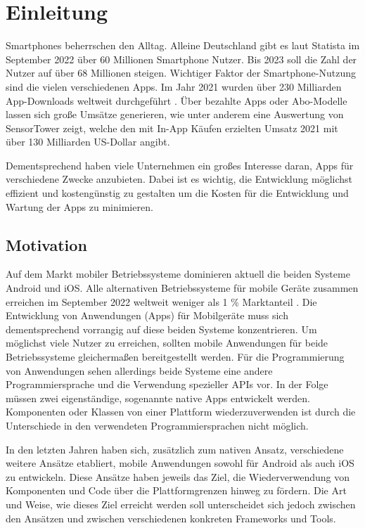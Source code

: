 \chapter{Einleitung}
\label{ch:Einleitung}


Smartphones beherrschen den Alltag.
Alleine Deutschland gibt es laut Statista \cite{Statista_SmartphonesDeutschland} im September 2022 über 60 Millionen Smartphone Nutzer.
Bis 2023 soll die Zahl der Nutzer auf über 68 Millionen steigen.
Wichtiger Faktor der Smartphone-Nutzung sind die vielen verschiedenen Apps.
Im Jahr 2021 wurden über 230 Milliarden App-Downloads weltweit durchgeführt \cite{Statista_AppDownloads}.
Über bezahlte Apps oder Abo-Modelle lassen sich große Umsätze generieren, wie unter anderem eine Auswertung von SensorTower \cite{SensorTower_AppUmsatz} zeigt, welche den mit In-App Käufen erzielten Umsatz 2021 mit über 130 Milliarden US-Dollar angibt.

Dementsprechend haben viele Unternehmen ein großes Interesse daran, Apps für verschiedene Zwecke anzubieten.
Dabei ist es wichtig, die Entwicklung möglichst effizient und kostengünstig zu gestalten um die Kosten für die Entwicklung und Wartung der Apps zu minimieren.

\section{Motivation}
\label{sec:Motivation}

Auf dem Markt mobiler Betriebssysteme dominieren aktuell die beiden Systeme Android und iOS.
Alle alternativen Betriebssysteme für mobile Geräte zusammen erreichen im September 2022 weltweit weniger als 1 \% Marktanteil \cite{mobile_market_share}.
Die Entwicklung von Anwendungen (Apps) für Mobilgeräte muss sich dementsprechend vorrangig auf diese beiden Systeme konzentrieren.
Um möglichst viele Nutzer zu erreichen, sollten mobile Anwendungen für beide Betriebssysteme gleichermaßen bereitgestellt werden.
Für die Programmierung von Anwendungen sehen allerdings beide Systeme eine andere Programmiersprache und die Verwendung spezieller \acp{API} vor.
In der Folge müssen zwei eigenständige, sogenannte native Apps entwickelt werden.
Komponenten oder Klassen von einer Plattform wiederzuverwenden ist durch die Unterschiede in den verwendeten Programmiersprachen nicht möglich.

In den letzten Jahren haben sich, zusätzlich zum nativen Ansatz, verschiedene weitere Ansätze etabliert, mobile Anwendungen sowohl für Android als auch iOS zu entwickeln.
Diese Ansätze haben jeweils das Ziel, die Wiederverwendung von Komponenten und Code über die Plattformgrenzen hinweg zu fördern.
Die Art und Weise, wie dieses Ziel erreicht werden soll unterscheidet sich jedoch zwischen den Ansätzen und zwischen verschiedenen konkreten Frameworks und Tools.


